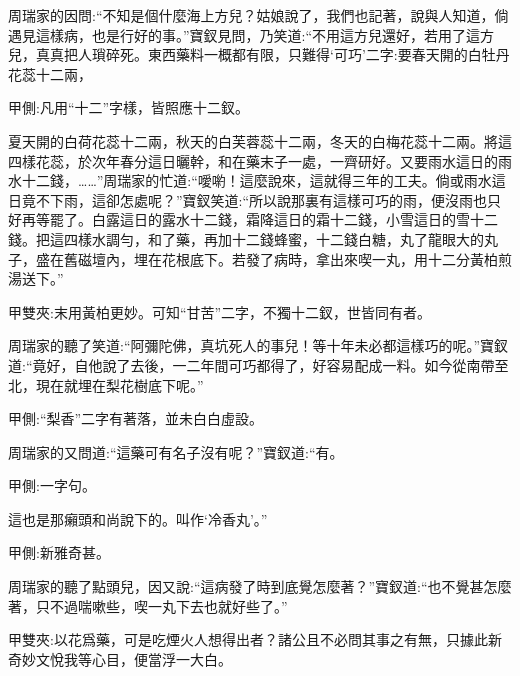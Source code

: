 \begin{parag}
    周瑞家的因問:“不知是個什麼海上方兒？姑娘說了，我們也記著，說與人知道，倘遇見這樣病，也是行好的事。”寶釵見問，乃笑道:“不用這方兒還好，若用了這方兒，真真把人瑣碎死。東西藥料一概都有限，只難得‘可巧’二字:要春天開的白牡丹花蕊十二兩，\begin{note}甲側:凡用“十二”字樣，皆照應十二釵。\end{note}夏天開的白荷花蕊十二兩，秋天的白芙蓉蕊十二兩，冬天的白梅花蕊十二兩。將這四樣花蕊，於次年春分這日曬幹，和在藥末子一處，一齊研好。又要雨水這日的雨水十二錢，……”周瑞家的忙道:“噯喲！這麼說來，這就得三年的工夫。倘或雨水這日竟不下雨，這卻怎處呢？”寶釵笑道:“所以說那裏有這樣可巧的雨，便沒雨也只好再等罷了。白露這日的露水十二錢，霜降這日的霜十二錢，小雪這日的雪十二錢。把這四樣水調勻，和了藥，再加十二錢蜂蜜，十二錢白糖，丸了龍眼大的丸子，盛在舊磁壇內，埋在花根底下。若發了病時，拿出來喫一丸，用十二分黃柏煎湯送下。”\begin{note}甲雙夾:末用黃柏更妙。可知“甘苦”二字，不獨十二釵，世皆同有者。\end{note}
\end{parag}


\begin{parag}
    周瑞家的聽了笑道:“阿彌陀佛，真坑死人的事兒！等十年未必都這樣巧的呢。”寶釵道:“竟好，自他說了去後，一二年間可巧都得了，好容易配成一料。如今從南帶至北，現在就埋在梨花樹底下呢。”\begin{note}甲側:“梨香”二字有著落，並未白白虛設。\end{note}周瑞家的又問道:“這藥可有名子沒有呢？”寶釵道:“有。\begin{note}甲側:一字句。\end{note}這也是那癩頭和尚說下的。叫作‘冷香丸’。”\begin{note}甲側:新雅奇甚。\end{note}周瑞家的聽了點頭兒，因又說:“這病發了時到底覺怎麼著？”寶釵道:“也不覺甚怎麼著，只不過喘嗽些，喫一丸下去也就好些了。”\begin{note}甲雙夾:以花爲藥，可是吃煙火人想得出者？諸公且不必問其事之有無，只據此新奇妙文悅我等心目，便當浮一大白。\end{note}
\end{parag}


